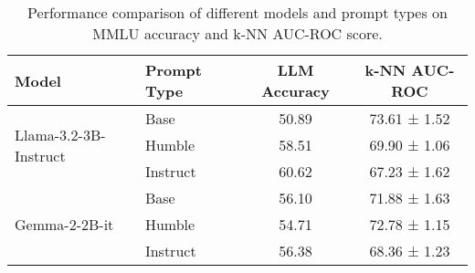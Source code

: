 \begin{table}[ht]
\centering
\caption{Performance comparison of different models and prompt types on MMLU accuracy and k-NN AUC-ROC score.}
\label{tab:model_comparison}
\begin{tabular}{l l c c}
\toprule
\textbf{Model} & \textbf{Prompt Type} & \textbf{LLM Accuracy} & \textbf{k-NN AUC-ROC} \\ 
\midrule
\multirow{3}{*}{Llama-3.2-3B-Instruct} 
    & Base     & 50.89 & 73.61 ± 1.52 \\ 
    & Humble   & 58.51 & 69.90 ± 1.06 \\ 
    & Instruct & 60.62 & 67.23 ± 1.62 \\ 
\midrule
\multirow{3}{*}{Gemma-2-2B-it}         
    & Base     & 56.10 & 71.88 ± 1.63 \\  
    & Humble   & 54.71 & 72.78 ± 1.15 \\  
    & Instruct & 56.38 & 68.36 ± 1.23 \\  
\bottomrule
\end{tabular}
\end{table}